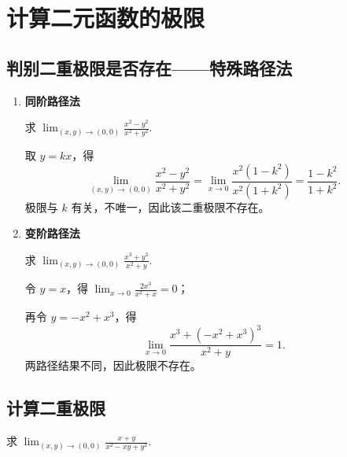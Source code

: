 
\section{计算二元函数的极限}

\subsection{判别二重极限是否存在——特殊路径法}

\begin{enumerate}
    \item \textbf{同阶路径法}

          \begin{example}{}{}
              求 $\displaystyle \lim_{(x,y)\to(0,0)}\frac{x^2-y^2}{x^2+y^2}$.
          \end{example}

          \begin{solution}
              取 $y=kx$，得
              $$
                  \lim_{(x,y)\to(0,0)}\frac{x^2-y^2}{x^2+y^2}
                  =\lim_{x\to0}\frac{x^2(1-k^2)}{x^2(1+k^2)}
                  =\frac{1-k^2}{1+k^2}.
              $$
              极限与 $k$ 有关，不唯一，因此该二重极限不存在。
          \end{solution}

    \item \textbf{变阶路径法}

          \begin{example}{}{}
              求 $\displaystyle \lim_{(x,y)\to(0,0)}\frac{x^3+y^3}{x^2+y}$.
          \end{example}

          \begin{solution}
              令 $y=x$，得 $\displaystyle \lim_{x\to0}\frac{2x^3}{x^2+x}=0$；

              再令 $y=-x^2+x^3$，得
              $$
                  \lim_{x\to0}\frac{x^3+(-x^2+x^3)^3}{x^2+y}=1.
              $$
              两路径结果不同，因此极限不存在。
          \end{solution}
\end{enumerate}


\subsection{计算二重极限}

\begin{example}{}{}
    求 $\displaystyle \lim_{(x,y)\to(0,0)}\frac{x+y}{x^{2}-xy+y^{2}}$.
\end{example}

